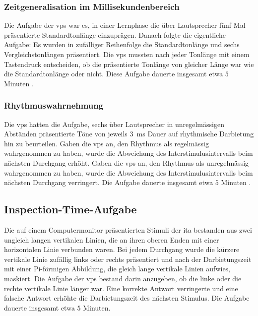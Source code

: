 \documentclass[11pt, twoside, a4paper]{book}		%
\begin{document}
\subsubsection*{Zeitgeneralisation im Millisekundenbereich}

Die Aufgabe der \glspl{vp} war es, in einer Lernphase die über Lautsprecher fünf Mal präsentierte Standardtonlänge einzuprägen. Danach folgte die eigentliche Aufgabe: Es wurden in zufälliger Reihenfolge die Standardtonlänge und sechs Vergleichstonlängen präsentiert. Die \glspl{vp} mussten nach jeder Tonlänge mit einem Tastendruck entscheiden, ob die präsentierte Tonlänge von gleicher Länge war wie die Standardtonlänge oder nicht. Diese Aufgabe dauerte insgesamt etwa $5$ Minuten \citep[siehe][]{Stauffer2011}.

\subsubsection*{Rhythmuswahrnehmung}

Die \glspl{vp} hatten die Aufgabe, sechs über Lautsprecher in unregelmässigen Abständen präsentierte Töne von jeweils $3$~ms Dauer auf rhythmische Darbietung hin zu beurteilen. 
Gaben die \glspl{vp} an, den Rhythmus als regelmässig wahrgenommen zu haben, wurde die Abweichung des Interstimulusintervalls beim nächsten Durchgang erhöht. Gaben die \glspl{vp} an, den Rhythmus als unregelmässig wahrgenommen zu haben, wurde die Abweichung des Interstimulusintervalls beim nächsten Durchgang verringert.
Die Aufgabe dauerte insgesamt etwa $5$ Minuten \citep[siehe][]{Stauffer2011}.

\subsection{Inspection-Time-Aufgabe}

Die auf einem Computermonitor präsentierten Stimuli der \gls{ita} \citep{Vickers1972} bestanden aus zwei ungleich langen vertikalen Linien, die an ihren oberen Enden mit einer horizontalen Linie verbunden waren. Bei jedem Durchgang wurde die kürzere vertikale Linie zufällig links oder rechts präsentiert und nach der Darbietungszeit mit einer Pi-förmigen Abbildung, die gleich lange vertikale Linien aufwies, maskiert. Die Aufgabe der \glspl{vp} bestand darin anzugeben, ob die linke oder die rechte vertikale Linie länger war. Eine korrekte Antwort verringerte und eine falsche Antwort erhöhte die Darbietungszeit des nächsten Stimulus. Die Aufgabe dauerte insgesamt etwa $5$ Minuten.
\end{document}
